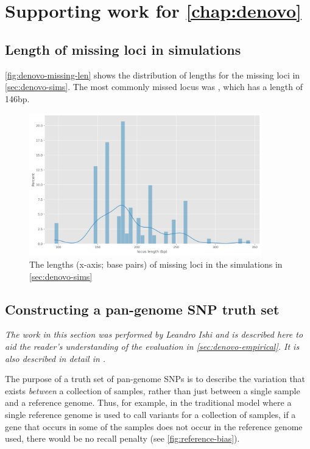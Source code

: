 \chapter{Supporting work for \autoref*{chap:denovo}}

\section{Length of missing loci in simulations}
\label{app:denovo-missing-lengths}

\autoref{fig:denovo-missing-len} shows the distribution of lengths for the missing loci in \autoref{sec:denovo-sims}. The most commonly missed locus was , which has a length of 146bp.

\begin{figure}
    \centering
    \includegraphics[width=0.9\textwidth]{Appendix0/Figs/denovo_missing_lengths.png}
    \caption{The lengths (x-axis; base pairs) of missing loci in the \denovo{} simulations in \autoref{sec:denovo-sims}}
    \label{fig:denovo-missing-len}
\end{figure}

\section{Constructing a pan-genome SNP truth set}
\label{app:pangenome-snp-truth}

\textit{The work in this section was performed by Leandro Ishi and is described here to aid the reader's understanding of the evaluation in \autoref{sec:denovo-empirical}. It is also described in detail in \cite{pandora}.}

The purpose of a truth set of pan-genome SNPs is to describe the variation that exists \emph{between} a collection of samples, rather than just between a single sample and a reference genome. Thus, for example, in the traditional model where a single reference genome is used to call variants for a collection of samples, if a gene that occurs in some of the samples does not occur in the reference genome used, there would be no recall penalty (see \autoref{fig:reference-bias}).

